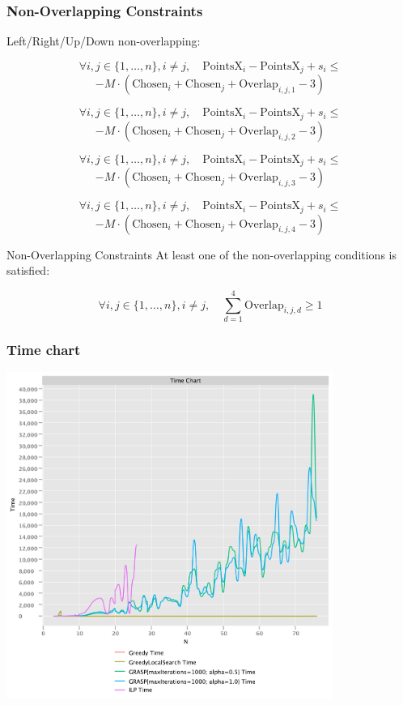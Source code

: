 \documentclass{beamer}
\begin{document}
\begin{frame}
\frametitle{Non-Overlapping Constraints}
Left/Right/Up/Down non-overlapping:


\[
\forall i, j \in \{1, \ldots, n\}, i \neq j, \quad \text{PointsX}_i - \text{PointsX}_j + s_i \leq
\]
\[
-M \cdot (\text{Chosen}_i + \text{Chosen}_j + \text{Overlap}_{i,j,1} - 3)
\]

\[
\forall i, j \in \{1, \ldots, n\}, i \neq j, \quad \text{PointsX}_i - \text{PointsX}_j + s_i \leq
\]
\[
-M \cdot (\text{Chosen}_i + \text{Chosen}_j + \text{Overlap}_{i,j,2} - 3)
\]

\[
\forall i, j \in \{1, \ldots, n\}, i \neq j, \quad \text{PointsX}_i - \text{PointsX}_j + s_i \leq
\]
\[
-M \cdot (\text{Chosen}_i + \text{Chosen}_j + \text{Overlap}_{i,j,3} - 3)
\]

\[
\forall i, j \in \{1, \ldots, n\}, i \neq j, \quad \text{PointsX}_i - \text{PointsX}_j + s_i \leq
\]
\[
-M \cdot (\text{Chosen}_i + \text{Chosen}_j + \text{Overlap}_{i,j,4} - 3)
\]
\end{frame}

\begin{frame}{Non-Overlapping Constraints}
At least one of the non-overlapping conditions is satisfied:

\[
\forall i, j \in \{1, \ldots, n\}, i \neq j, \quad \sum_{d=1}^4 \text{Overlap}_{i,j,d} \geq 1
\]
    
\end{frame}

\begin{frame}
\frametitle{Time chart}
\includegraphics[width=0.8\textwidth]{./documentation/assets/timeChart.pdf}
\end{frame}
\end{document}
